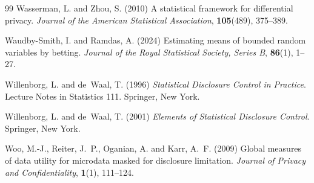 \documentclass[11pt,a4paper]{article}
\theoremstyle{plain}
\theoremstyle{definition}
\begin{document}
\begin{thebibliography}{99}
Wasserman, L. and Zhou, S. (2010) A statistical framework for differential
privacy. \emph{Journal of the American Statistical Association},
\textbf{105}(489), 375--389.

Waudby-Smith, I. and Ramdas, A. (2024) Estimating means of bounded random
variables by betting. \emph{Journal of the Royal Statistical Society, Series
B}, \textbf{86}(1), 1--27.

Willenborg, L. and de~Waal, T. (1996) \emph{Statistical Disclosure Control in
Practice}. Lecture Notes in Statistics 111. Springer, New York.

Willenborg, L. and de~Waal, T. (2001) \emph{Elements of Statistical Disclosure
Control}. Springer, New York.

Woo, M.-J., Reiter, J.~P., Oganian, A. and Karr, A.~F. (2009) Global measures
of data utility for microdata masked for disclosure limitation. \emph{Journal
of Privacy and Confidentiality}, \textbf{1}(1), 111--124.

\end{thebibliography}
\end{document}
